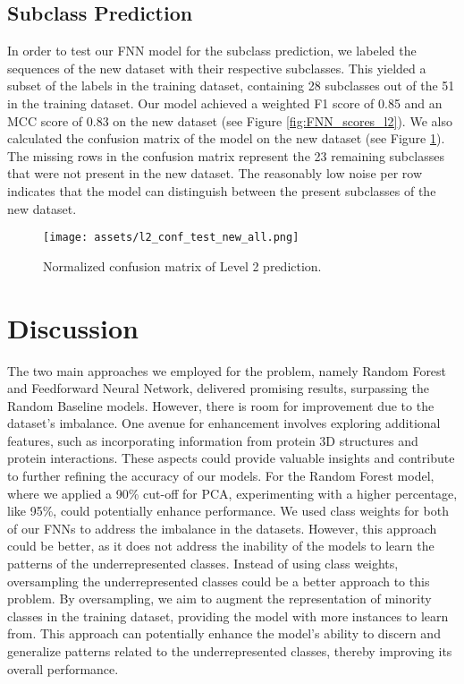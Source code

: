 \documentclass{bioinfo}
\begin{document}
\subsection{Subclass Prediction}
In order to test our FNN model for the subclass prediction, we labeled the sequences of the new dataset with their respective subclasses.
This yielded a subset of the labels in the training dataset, containing 28 subclasses out of the 51 in the training dataset.
Our model achieved a weighted F1 score of 0.85 and an MCC score of 0.83 on the new dataset (see Figure \ref{fig:FNN_scores_l2}).
We also calculated the confusion matrix of the model on the new dataset (see Figure \ref{fig:FNN_conf_l2}).
The missing rows in the confusion matrix represent the 23 remaining subclasses that were not present in the new dataset.
The reasonably low noise per row indicates that the model can distinguish between the present subclasses of the new dataset.


\begin{figure}[!b]
\texttt{[image: assets/l2\_conf\_test\_new\_all.png]}
\caption{Normalized confusion matrix of Level 2 prediction.}\label{fig:FNN_conf_l2}
\end{figure}

\section{Discussion}
The two main approaches we employed for the problem, namely Random Forest and Feedforward Neural Network, delivered promising results, surpassing the Random Baseline models.
However, there is room for improvement due to the dataset's imbalance.
One avenue for enhancement involves exploring additional features, such as incorporating information from protein 3D structures and protein interactions.
These aspects could provide valuable insights and contribute to further refining the accuracy of our models.
For the Random Forest model, where we applied a 90\% cut-off for PCA, experimenting with a higher percentage, 
like 95\%, could potentially enhance performance.
We used class weights for both of our FNNs to address the imbalance in the datasets.
However, this approach could be better, as it does not address the inability of the models to learn the patterns of the underrepresented classes.
Instead of using class weights, oversampling the underrepresented classes could be a better approach to this problem.
By oversampling, we aim to augment the representation of minority classes in the training dataset, 
providing the model with more instances to learn from. 
This approach can potentially enhance the model's ability to discern and generalize patterns related to the underrepresented 
classes, thereby improving its overall performance.
\end{document}
